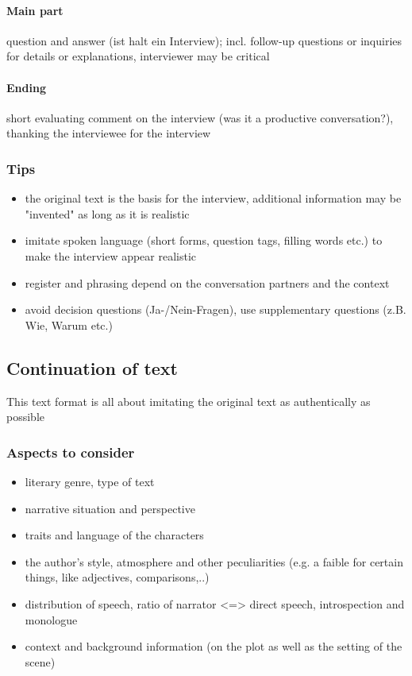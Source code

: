 \documentclass{article}
\begin{document}
	\paragraph{Main part}
	question and answer (ist halt ein Interview); incl. follow-up questions or inquiries for details or explanations, interviewer may be critical

	\paragraph{Ending}
	short evaluating comment on the interview (was it a productive conversation?), thanking the interviewee for the interview

	\subsubsection{Tips}
	\begin{itemize}
		\item the original text is the basis for the interview, additional information may be "invented" as long as it is realistic
		\item imitate spoken language (short forms, question tags, filling words etc.) to make the interview appear realistic
		\item register and phrasing depend on the conversation partners and the context
		\item avoid decision questions (Ja-/Nein-Fragen), use supplementary questions (z.B. Wie, Warum etc.)
	\end{itemize}

	\subsection{Continuation of text}
	This text format is all about imitating the original text as authentically as possible

	\subsubsection{Aspects to consider}
	\begin{itemize}
		\item literary genre, type of text
		\item narrative situation and perspective
		\item traits and language of the characters
		\item the author’s style, atmosphere and other peculiarities (e.g. a faible for certain things, like adjectives, comparisons,..)
		\item distribution of speech, ratio of narrator <=> direct speech, introspection and monologue
		\item context and background information (on the plot as well as the setting of the scene)
	\end{itemize}
\end{document}
